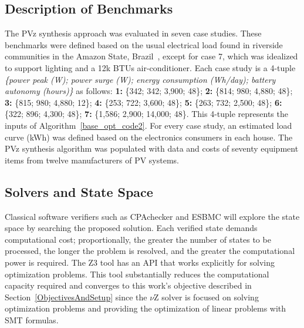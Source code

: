 \documentclass[a4paper,donotrepeattitle,fleqn]{cas-dc}
\begin{document}
\subsection{Description of Benchmarks}

The PVz synthesis approach was evaluated in seven case studies. These benchmarks were defined based on the usual electrical load found in riverside communities in the Amazon State, Brazil~\cite{TrindadeCordeiro19,Agrener2013}, except for case 7, which was idealized to support lighting and a 12k BTUs air-conditioner.  
Each case study is a 4-tuple \textit{\{power peak (W); power surge (W); energy consumption (Wh/day); battery autonomy (hours)\} } as follows:
  \textbf{1:} \{342; 342; 3,900; 48\}; \textbf{2:} \{814; 980; 4,880; 48\}; \textbf{3:} \{815; 980; 4,880; 12\}; \textbf{4:} \{253; 722; 3,600; 48\}; \textbf{5:} \{263; 732; 2,500; 48\}; \textbf{6:} \{322; 896; 4,300; 48\}; \textbf{7:} \{1,586; 2,900; 14,000; 48\}. This 4-tuple represents the inputs of Algorithm~\ref{base_opt_code2}. For every case study, an estimated load curve (kWh) was defined based on the electronics consumers in each house. The PVz synthesis algorithm was populated with data and costs of seventy equipment items from twelve manufacturers of PV systems. 

\subsection{Solvers and State Space}
\label{sec:SolversandStateSpace}
  Classical software verifiers such as CPAchecker and ESBMC will explore the state space by searching the proposed solution. Each verified state demands computational cost; proportionally, the greater the number of states to be processed, the longer the problem is resolved, and the greater the computational power is required. The Z3 tool has an API that works explicitly for solving optimization problems. This tool substantially reduces the computational capacity required and converges to this work's objective described in Section~\ref{ObjectivesAndSetup} since the $\nu$Z solver is focused on solving optimization problems and providing the optimization of linear problems with SMT formulas.
\end{document}
